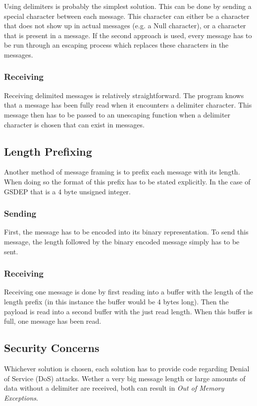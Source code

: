 Using delimiters is probably the simplest solution. This can be done by sending a special character between each message. This character can either be a character that does not show up in actual messages (e.g. a Null character), or a character that is present in a message. If the second approach is used, every message has to be run through an escaping process which replaces these characters in the messages.

\subsubsection{Receiving}

Receiving delimited messages is relatively straightforward. The program knows that a message has been fully read when it encounters a delimiter character. This message then has to be passed to an unescaping function when a delimiter character is chosen that can exist in messages.

\subsection{Length Prefixing}

Another method of message framing is to prefix each message with its length. When doing so the format of this prefix has to be stated explicitly. In the case of GSDEP that is a 4 byte unsigned integer.

\subsubsection{Sending}

First, the message has to be encoded into its binary representation. To send this message, the length followed by the binary encoded message simply has to be sent.

\subsubsection{Receiving}

Receiving one message is done by first reading into a buffer with the length of the length prefix (in this instance the buffer would be 4 bytes long). Then the payload is read into a second buffer with the just read length. When this buffer is full, one message has been read.

\subsection{Security Concerns}

Whichever solution is chosen, each solution has to provide code regarding Denial of Service (DoS) attacks. Wether a very big message length or large amounts of data without a delimiter are received, both can result in \textit{Out of Memory Exceptions}.
